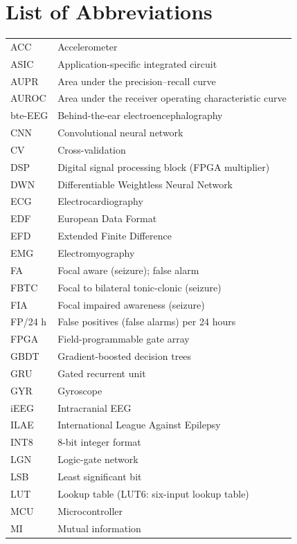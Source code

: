 \chapter*{List of Abbreviations}
\begin{longtable}{@{}p{30mm}p{120mm}@{}}
ACC & Accelerometer\\
ASIC & Application-specific integrated circuit\\
AUPR & Area under the precision--recall curve\\
AUROC & Area under the receiver operating characteristic curve\\
bte-EEG & Behind-the-ear electroencephalography\\
CNN & Convolutional neural network\\
CV & Cross-validation\\
DSP & Digital signal processing block (FPGA multiplier)\\
DWN & Differentiable Weightless Neural Network\\
ECG & Electrocardiography\\
EDF & European Data Format\\
EFD & Extended Finite Difference\\
EMG & Electromyography\\
FA & Focal aware (seizure); false alarm\\
FBTC & Focal to bilateral tonic-clonic (seizure)\\
FIA & Focal impaired awareness (seizure)\\
FP/24 h & False positives (false alarms) per 24 hours\\
FPGA & Field-programmable gate array\\
GBDT & Gradient-boosted decision trees\\
GRU & Gated recurrent unit\\
GYR & Gyroscope\\
iEEG & Intracranial EEG\\
ILAE & International League Against Epilepsy\\
INT8 & 8-bit integer format\\
LGN & Logic-gate network\\
LSB & Least significant bit\\
LUT & Lookup table (LUT6: six-input lookup table)\\
MCU & Microcontroller\\
MI & Mutual information\\

\end{longtable}
